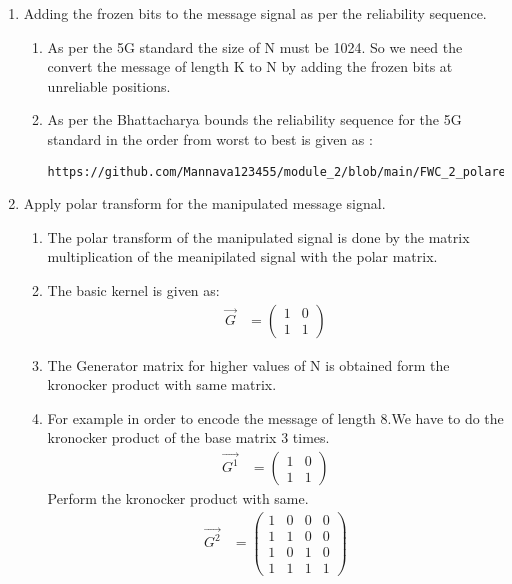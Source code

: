 \documentclass[journal,5pt,twocolumn]{IEEEtran}
\begin{document}
\begin{enumerate}
\item Adding the frozen bits to the message signal as per the reliability sequence.
\begin{enumerate}
\item As per the 5G standard the size of N must be 1024. So we need the convert the message of length K to N by adding the frozen bits at unreliable positions.
\item As per the Bhattacharya bounds the reliability sequence for the 5G standard in the order from worst to best is given as :
\begin{lstlisting}
https://github.com/Mannava123455/module_2/blob/main/FWC_2_polarencoder/codes/reliability_sequence.dat
\end{lstlisting}
\end{enumerate}
\item Apply polar transform for the manipulated message signal.
\begin{enumerate}
\item The polar transform of the manipulated signal is done by the matrix multiplication of the meanipilated signal with the polar matrix.
\item The basic kernel is given as:
\begin{align}
\vec{G}&=
\begin{pmatrix}
1 & 0 \\
1 & 1 
\end{pmatrix}
\end{align}
\item The Generator matrix for higher values of N is obtained form the kronocker product with same matrix.
\item For example in order to encode the message of length 8.We have to do the kronocker product of the base matrix 3 times.\\
\begin{align}
\vec{G^1}&=
\begin{pmatrix}
1 & 0 \\
1 & 1 
\end{pmatrix}
\end{align}
Perform the kronocker product with same.\\
\begin{align}
\vec{G^2}&=
\begin{pmatrix}
1 & 0 & 0 & 0 \\
1 & 1 & 0 & 0 \\
1 & 0 & 1 & 0 \\
1 & 1 & 1 & 1 

\end{pmatrix}
\end{align}
\end{enumerate}
\end{enumerate}
\end{document}
